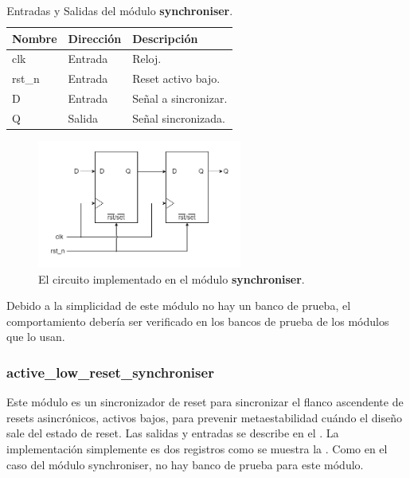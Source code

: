 \documentclass[a4paper, twoside, 11pt]{report}
\begin{document}
\begin{table}[htb]
  \centering
  \tablezebra
  \begin{tabulary}{\linewidth}{l|l|L}
    \textbf{Nombre}&\textbf{Dirección}&\textbf{Descripción} \\
    \hline
    clk&Entrada&Reloj. \\
    rst\_n&Entrada&Reset activo bajo. \\
    D&Entrada&Señal a sincronizar. \\
    Q&Salida&Señal sincronizada. \\
  \end{tabulary}
  \caption{Entradas y Salidas del módulo \textbf{synchroniser}.}
  \label{tab:ports_synchroniser}
\end{table}

\begin{figure}[htb]
  \centering
  \includegraphics[width=0.6\textwidth]{./img/synchroniser.drawio}
  \caption{El circuito implementado en el módulo \textbf{synchroniser}.}
  \label{fig:synchroniser}
\end{figure}

Debido a la simplicidad de este módulo no hay un banco de prueba, el comportamiento debería ser verificado en los bancos de prueba de los módulos que lo usan.

\FloatBarrier
\subsubsection{active\_low\_reset\_synchroniser}

Este módulo es un sincronizador de reset para sincronizar el flanco ascendente de resets asincrónicos, activos bajos, para prevenir metaestabilidad cuándo el diseño sale del estado de reset. Las salidas y entradas se describe en el . La implementación simplemente es dos registros como se muestra la . Como en el caso del módulo synchroniser, no hay banco de prueba para este módulo.
\end{document}
